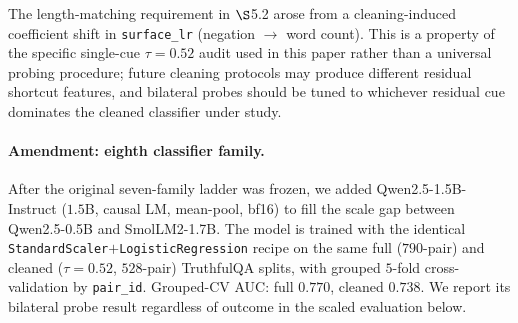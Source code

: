 The length-matching requirement in $\S$5.2 arose from a
cleaning-induced coefficient shift in \texttt{surface\_lr} (negation
$\to$ word count). This is a property of the specific single-cue
$\tau=0.52$ audit used in this paper rather than a universal
probing procedure; future cleaning protocols may produce different
residual shortcut features, and bilateral probes should be tuned to
whichever residual cue dominates the cleaned classifier under study.


%

\paragraph{Amendment: eighth classifier family.} After the original
seven-family ladder was frozen, we added Qwen2.5-1.5B-Instruct
($1.5$B, causal LM, mean-pool, bf16) to fill the scale gap between
Qwen2.5-0.5B and SmolLM2-1.7B. The model is trained with the
identical \texttt{StandardScaler}${+}$\texttt{LogisticRegression}
recipe on the same full ($790$-pair) and cleaned ($\tau=0.52$,
$528$-pair) TruthfulQA splits, with grouped $5$-fold cross-validation
by \texttt{pair\_id}. Grouped-CV AUC: full $0.770$, cleaned $0.738$.
We report its bilateral probe result regardless of outcome in the
scaled evaluation below.

